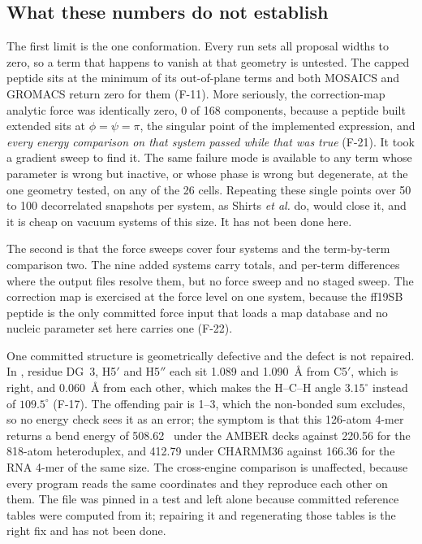 \subsection{What these numbers do not establish}
\label{sec:limits}

The first limit is the one conformation. Every run sets all proposal widths to
zero, so a term that happens to vanish at that geometry is untested. The capped
peptide sits at the minimum of its out-of-plane terms and both MOSAICS and
GROMACS return zero for them (F-11). More seriously, the correction-map
analytic force was identically zero, 0 of 168 components, because a peptide
built extended sits at $\phi = \psi = \pi$, the singular point of the
implemented expression, and \emph{every energy comparison on that system passed
while that was true} (F-21). It took a gradient sweep to find it. The same
failure mode is available to any term whose parameter is wrong but inactive, or
whose phase is wrong but degenerate, at the one geometry tested, on any of the
26 cells. Repeating these single points over 50 to 100 decorrelated snapshots
per system, as Shirts \emph{et al.}\cite{shirts2017engines} do, would close it,
and it is cheap on vacuum systems of this size. It has not been done here.

The second is that the force sweeps cover four systems and the term-by-term
comparison two. The nine added systems carry totals, and per-term differences
where the output files resolve them, but no force sweep and no staged sweep.
The correction map is exercised at the force level on one system, because the
ff19SB peptide is the only committed force input that loads a map database and
no nucleic parameter set here carries one (F-22).

One committed structure is geometrically defective and the defect is not
repaired. In , residue DG~3,
H5$'$ and H5$''$ each sit 1.089 and 1.090~\AA{} from C5$'$, which is right, and
0.060~\AA{} from each other, which makes the H--C--H angle $3.15^{\circ}$
instead of $109.5^{\circ}$ (F-17). The offending pair is 1--3, which the
non-bonded sum excludes, so no energy check sees it as an error; the symptom is
that this 126-atom 4-mer returns a bend energy of 508.62~\kcal{} under the AMBER
decks against 220.56 for the 818-atom heteroduplex, and 412.79 under CHARMM36
against 166.36 for the RNA 4-mer of the same size. The cross-engine comparison
is unaffected, because every program reads the same coordinates and they
reproduce each other on them. The file was pinned in a test and left alone
because committed reference tables were computed from it; repairing it and
regenerating those tables is the right fix and has not been done.

